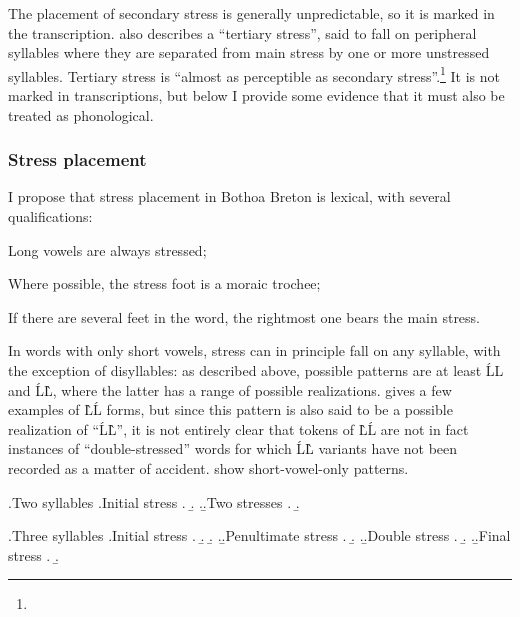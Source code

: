 The placement of secondary stress is generally unpredictable, so it is marked in the transcription. \citet{humphreys95:_phonol_bothoa_saint_nicol_pelem} also describes a \enquote{tertiary stress}, said to fall on peripheral syllables where they are separated from main stress by one or more unstressed syllables. Tertiary stress is \enquote{almost as perceptible as secondary stress}.\footnote{} It is not marked in  transcriptions, but below I provide some evidence that it must also be treated as phonological.

\subsubsection{Stress placement}
\label{sec:stress-placement}

I propose that stress placement in Bothoa Breton is lexical, with several qualifications:

\begin{itemize*}
\item Long vowels are always stressed;
\item Where possible, the stress foot is a moraic trochee;
\item If there are several feet in the word, the rightmost one bears the main stress.
\end{itemize*}

In words with only short vowels, stress can in principle fall on any syllable, with the exception of disyllables: as described above, possible patterns are at least \'LL and \'L\`L, where the latter has a range of possible realizations. \citet{humphreys95:_phonol_bothoa_saint_nicol_pelem} gives a few examples of \`L\'L forms, but since this pattern is also said to be a possible realization of \enquote{\'L\`L}, it is not entirely clear that tokens of \`L\'L are not in fact instances of \enquote{double-stressed} words for which \'L\`L variants have not been recorded as a matter of accident.  show short-vowel-only patterns.

\ex.\label{bothoa-ll}Two syllables
\a.Initial stress
\a.
\b.
\z.\b.Two stresses
\a.
\b.

\ex.\label{bothoa-lll}Three syllables
\a.Initial stress
\a.
\b.
\b.
\z.\b.Penultimate stress
\a.
\b.
\z.\b.Double stress
\a.
\b.
\z.\b.Final stress
\a.
\b.

